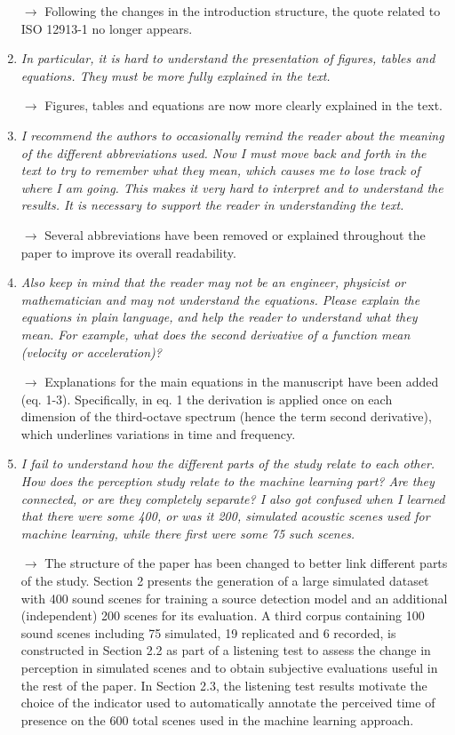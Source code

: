 \documentclass[10pt]{article}
\begin{document}
\begin{enumerate}
$\rightarrow$ Following the changes in the introduction structure, the quote related to ISO 12913-1 no longer appears.

\item \emph{In particular, it is hard to understand the presentation of figures, tables and equations. They must be more fully explained in the text.}

$\rightarrow$ Figures, tables and equations are now more clearly explained in the text.

\item \emph{I recommend the authors to occasionally remind the reader about the meaning of the different abbreviations used. Now I must move back and forth in the text to try to remember what they mean, which causes me to lose track of where I am going. This makes it very hard to interpret and to understand the results. It is necessary to support the reader in understanding the text.}

$\rightarrow$ Several abbreviations have been removed or explained throughout the paper to improve its overall readability.

\item \emph{Also keep in mind that the reader may not be an engineer, physicist or mathematician and may not understand the equations. Please explain the equations in plain language, and help the reader to understand what they mean. For example, what does the second derivative of a function mean (velocity or acceleration)?}

$\rightarrow$ Explanations for the main equations in the manuscript have been added (eq. 1-3). Specifically, in eq. 1 the derivation is applied once on each dimension of the third-octave spectrum (hence the term second derivative), which underlines variations in time and frequency.

\item \emph{I fail to understand how the different parts of the study relate to each other. How does the perception study relate to the machine learning part? Are they connected, or are they completely separate? I also got confused when I learned that there were some 400, or was it 200, simulated acoustic scenes used for machine learning, while there first were some 75 such scenes.}

$\rightarrow$ The structure of the paper has been changed to better link different parts of the study. Section 2 presents the generation of a large simulated dataset with 400 sound scenes for training a source detection model and an additional (independent) 200 scenes for its evaluation. A third corpus containing 100 sound scenes including 75 simulated, 19 replicated and 6 recorded, is constructed in Section 2.2 as part of a listening test to assess the change in perception in simulated scenes and to obtain subjective evaluations useful in the rest of the paper. In Section 2.3, the listening test results motivate the choice of the indicator used to automatically annotate the perceived time of presence on the 600 total scenes used in the machine learning approach.


\end{enumerate}
\end{document}

